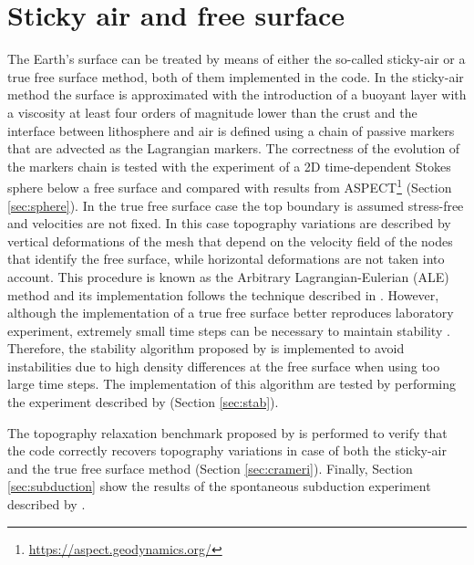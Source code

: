 \documentclass[hidelinks,10pt,a4paper]{article}
\begin{document}
\section{Sticky air and free surface}\label{sec:sticky}
The Earth's surface can be treated by means of either the so-called sticky-air or a true free surface method, both of them implemented in the code. In the
sticky-air method the surface is approximated with the introduction of a buoyant layer with a viscosity at least four orders of magnitude lower than the crust
\citep{Schmeling2008,Crameri2012} and the interface between lithosphere and air is defined using a chain of passive markers that are advected as the Lagrangian
markers. The correctness of the evolution of the markers chain is tested with the experiment of a 2D time-dependent Stokes sphere below a free surface and
compared with results from ASPECT\footnote{\url{https://aspect.geodynamics.org/}} \citep{Kronbichler2012,Heister2017,Bangerth2020,Bangerth2020a} (Section
\ref{sec:sphere}). In the true free surface case the top boundary is assumed stress-free and velocities are not fixed. In this case topography variations are
described by vertical deformations of the mesh that depend on the velocity field of the nodes that identify the free surface, while horizontal deformations are
not taken into account. This procedure is known as the Arbitrary Lagrangian-Eulerian (ALE) method and its implementation follows the technique described in
\citet{Thieulot2011}. However, although the implementation of a true free surface better reproduces laboratory experiment, extremely small time steps can be
necessary to maintain stability \citep{Kaus2010a,Quinquis2011,Thieulot2014}. Therefore, the stability algorithm proposed by \citet{Kaus2010a} is implemented
to avoid instabilities due to high density differences at the free surface when using too large time steps. The implementation of this algorithm are tested by
performing the experiment described by \citet{Kaus2010a} (Section \ref{sec:stab}).

The topography relaxation benchmark proposed by \citet{Crameri2012} is performed to verify that the code correctly recovers topography variations in case of
both the sticky-air and the true free surface method (Section \ref{sec:crameri}). Finally, Section \ref{sec:subduction} show the results of the spontaneous
subduction experiment described by \citet{Schmeling2008}.
\end{document}
